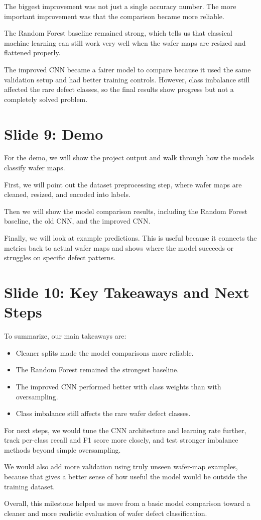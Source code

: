\documentclass[11pt]{article}
\begin{document}
The biggest improvement was not just a single accuracy number. The more important improvement was that the comparison became more reliable.

The Random Forest baseline remained strong, which tells us that classical machine learning can still work very well when the wafer maps are resized and flattened properly.

The improved CNN became a fairer model to compare because it used the same validation setup and had better training controls. However, class imbalance still affected the rare defect classes, so the final results show progress but not a completely solved problem.

\section*{Slide 9: Demo}

For the demo, we will show the project output and walk through how the models classify wafer maps.

First, we will point out the dataset preprocessing step, where wafer maps are cleaned, resized, and encoded into labels.

Then we will show the model comparison results, including the Random Forest baseline, the old CNN, and the improved CNN.

Finally, we will look at example predictions. This is useful because it connects the metrics back to actual wafer maps and shows where the model succeeds or struggles on specific defect patterns.

\section*{Slide 10: Key Takeaways and Next Steps}

To summarize, our main takeaways are:

\begin{itemize}
    \item Cleaner splits made the model comparisons more reliable.
    \item The Random Forest remained the strongest baseline.
    \item The improved CNN performed better with class weights than with oversampling.
    \item Class imbalance still affects the rare wafer defect classes.
\end{itemize}

For next steps, we would tune the CNN architecture and learning rate further, track per-class recall and F1 score more closely, and test stronger imbalance methods beyond simple oversampling.

We would also add more validation using truly unseen wafer-map examples, because that gives a better sense of how useful the model would be outside the training dataset.

Overall, this milestone helped us move from a basic model comparison toward a cleaner and more realistic evaluation of wafer defect classification.
\end{document}
